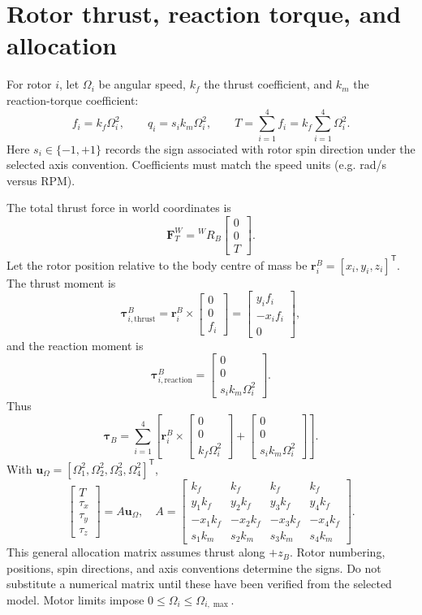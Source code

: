 \documentclass[11pt,a4paper]{article}
\begin{document}
\section{Rotor thrust, reaction torque, and allocation}
For rotor \(i\), let \(\Omega_i\) be angular speed, \(k_f\) the thrust coefficient, and \(k_m\) the reaction-torque coefficient:
\[
f_i=k_f\Omega_i^2,\qquad q_i=s_i k_m\Omega_i^2,\qquad
T=\sum_{i=1}^4f_i=k_f\sum_{i=1}^4\Omega_i^2.
\]
Here \(s_i\in\{-1,+1\}\) records the sign associated with rotor spin direction under the selected axis convention. Coefficients must match the speed units (e.g. rad/s versus RPM).

The total thrust force in world coordinates is
\[
\mathbf F_T^W={}^WR_B\begin{bmatrix}0\\0\\T\end{bmatrix}.
\]
Let the rotor position relative to the body centre of mass be \(\mathbf r_i^B=[x_i,y_i,z_i]^{\mathsf T}\). The thrust moment is
\[
\boldsymbol\tau_{i,\mathrm{thrust}}^B=
\mathbf r_i^B\times\begin{bmatrix}0\\0\\f_i\end{bmatrix}
=\begin{bmatrix}y_i f_i\\-x_i f_i\\0\end{bmatrix},
\]
and the reaction moment is
\[
\boldsymbol\tau_{i,\mathrm{reaction}}^B=
\begin{bmatrix}0\\0\\s_i k_m\Omega_i^2\end{bmatrix}.
\]
Thus
\[
\boldsymbol\tau_B=\sum_{i=1}^4\left[
\mathbf r_i^B\times\begin{bmatrix}0\\0\\k_f\Omega_i^2\end{bmatrix}
+\begin{bmatrix}0\\0\\s_i k_m\Omega_i^2\end{bmatrix}\right].
\]
With \(\mathbf u_\Omega=[\Omega_1^2,\Omega_2^2,\Omega_3^2,\Omega_4^2]^{\mathsf T}\),
\[
\begin{bmatrix}T\\\tau_x\\\tau_y\\\tau_z\end{bmatrix}=A\mathbf u_\Omega,\quad
A=\begin{bmatrix}
k_f&k_f&k_f&k_f\\
y_1k_f&y_2k_f&y_3k_f&y_4k_f\\
-x_1k_f&-x_2k_f&-x_3k_f&-x_4k_f\\
s_1k_m&s_2k_m&s_3k_m&s_4k_m
\end{bmatrix}.
\]
This general allocation matrix assumes thrust along \(+z_B\). Rotor numbering, positions, spin directions, and axis conventions determine the signs. Do not substitute a numerical matrix until these have been verified from the selected model. Motor limits impose \(0\leq\Omega_i\leq\Omega_{i,\max}\).
\end{document}
